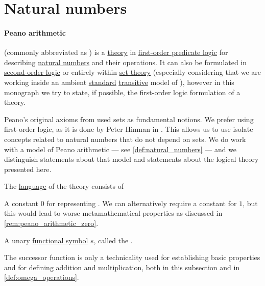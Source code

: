 \section{Natural numbers}\label{sec:natural_numbers}

\paragraph{Peano arithmetic}

\begin{definition}\label{def:peano_arithmetic}
   (commonly abbreviated as ) is a \hyperref[def:first_order_theory]{theory} in \hyperref[sec:first_order_logic]{first-order predicate logic} for describing \hyperref[def:natural_numbers]{natural numbers} and their operations. It can also be formulated in \hyperref[def:simply_typed_hol]{second-order logic} or entirely within \hyperref[ch:set_theory]{set theory} (especially considering that we are working inside an ambient \hyperref[rem:standard_model_of_set_theory]{standard} \hyperref[rem:transitive_model_of_set_theory]{transitive} model of \hyperref[def:axiom_of_universes]{}), however in this monograph we try to state, if possible, the first-order logic formulation of a theory.

  Peano's original axioms from \cite[1]{Peano1889ArithmeticesPrincipia} used sets as fundamental notions. We prefer using first-order logic, as it is done by Peter Hinman in . This allows us to use isolate concepts related to natural numbers that do not depend on sets. We do work with a model of Peano arithmetic --- see \cref{def:natural_numbers} --- and we distinguish statements about that model and statements about the logical theory presented here.

  The \hyperref[def:first_order_language]{language} of the theory consists of
  \begin{thmenum}[series=def:peano_arithmetic]
     A constant \( 0 \) for representing . We can alternatively require a constant for \( 1 \), but this would lead to worse metamathematical properties as discussed in \cref{rem:peano_arithmetic_zero}.

     A unary \hyperref[def:first_order_language/fun]{functional symbol} \( s \), called the .

    The successor function is only a technicality used for establishing basic properties and for defining addition and multiplication, both in this subsection and in \cref{def:omega_operations}.


\end{thmenum}
\end{definition}
